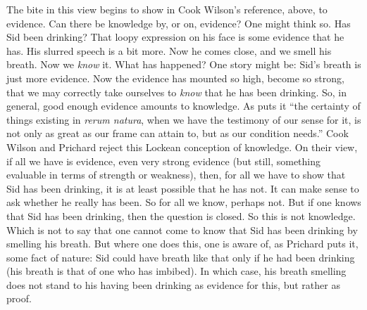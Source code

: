The bite in this view begins to show in Cook Wilson's reference, above, to evidence. Can there be knowledge by, or on, evidence? One might think so. Has Sid been drinking? That loopy expression on his face is some evidence that he has. His slurred speech is a bit more. Now he comes close, and we smell his breath. Now we \emph{know} it. What has happened? One story might be: Sid's breath is just more evidence. Now the evidence has mounted so high, become so strong, that we may correctly take ourselves to \emph{know} that he has been drinking. So, in general, good enough evidence amounts to knowledge. As \citet[]{Locke1690An-Essay-Concer} puts it ``the certainty of things existing in \emph{rerum natura}, when we have the testimony of our sense for it, is not only as great as our frame can attain to, but as our condition needs.'' Cook Wilson and Prichard reject this Lockean conception of knowledge. On their view, if all we have is evidence, even very strong evidence (but still, something evaluable in terms of strength or weakness), then, for all we have to show that Sid has been drinking, it is at least possible that he has not. It can make sense to ask whether he really has been. So for all we know, perhaps not. But if one knows that Sid has been drinking, then the question is closed. So this is not knowledge. Which is not to say that one cannot come to know that Sid has been drinking by smelling his breath. But where one does this, one is aware of, as Prichard puts it, some fact of nature: Sid could have breath like that only if he had been drinking (his breath is that of one who has imbibed). In which case, his breath smelling does not stand to his having been drinking as evidence for this, but rather as proof.

